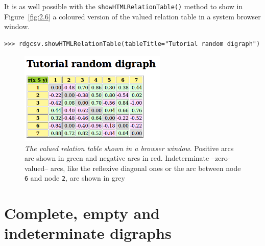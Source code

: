 It is as well possible with the \texttt{showHTMLRelationTable()} method to show in Figure~\vref{fig:2.6} a coloured version of the valued relation table in a system browser window. 
\begin{lstlisting}
>>> rdgcsv.showHTMLRelationTable(tableTitle="Tutorial random digraph")
\end{lstlisting}
 \begin{figure}[ht]
\sidecaption[t]
\includegraphics[width=7cm]{Figures/2-6-htmlTutorialDigraph.png}
\caption[The valued relation table shown in a browser window]{\emph{The valued relation table shown in a browser window}. Positive arcs are shown in green and negative arcs in red. Indeterminate --zero-valued-- arcs, like the reflexive diagonal ones or the arc between node \texttt{6} and node \texttt{2}, are shown in grey}
\label{fig:2.6}       %
\end{figure}
 
\section{Complete, empty and indeterminate digraphs}
\label{sec:2.10}

